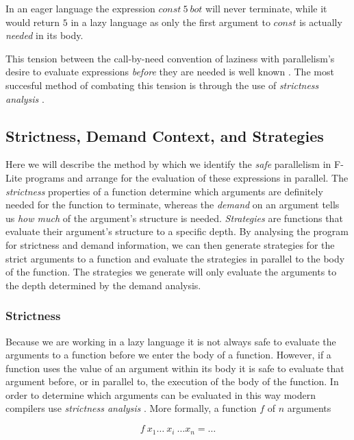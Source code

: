In an eager language the expression $const\ 5\ bot$ will never terminate,
while it would return $5$ in a lazy language as only the first argument
to $const$ is actually \emph{needed} in its body.

\medskip


This tension between the call-by-need convention of laziness with parallelism's
desire to evaluate expressions \emph{before} they are needed is well known
\citep{tremblay1995impact}. The most succesful method of combating this tension
is through the use of \emph{strictness analysis} \citep{mycroft1980theory,
wadler1987projections, hinze1995projection}.


\subsection{Strictness, Demand Context, and Strategies}

Here we will describe the method by which we identify the \emph{safe}
parallelism in F-Lite programs and arrange for the evaluation of these
expressions in parallel. The \emph{strictness} properties of a function
determine which arguments are definitely needed for the function to terminate,
whereas the \emph{demand} on an argument tells us \emph{how much} of the
argument's structure is needed. \emph{Strategies} are functions that evaluate
their argument's structure to a specific depth. By analysing the program for
strictness and demand information, we can then generate strategies for the
strict arguments to a function and evaluate the strategies in parallel to the
body of the function. The strategies we generate will only evaluate the
arguments to the depth determined by the demand analysis.

\subsubsection*{Strictness}

Because we are working in a lazy language it is not always safe to evaluate the
arguments to a function before we enter the body of a function. However, if a
function uses the value of an argument within its body it is safe to evaluate
that argument before, or in parallel to, the execution of the body of the
function. In order to determine which arguments can be evaluated in this way
modern compilers use \emph{strictness analysis} \citep{mycroft1980theory}. More
formally, a function $f$ of $n$ arguments

$$
    f\ x_{1} \dots \ x_{i} \ \dots x_{n} = \dots
$$

